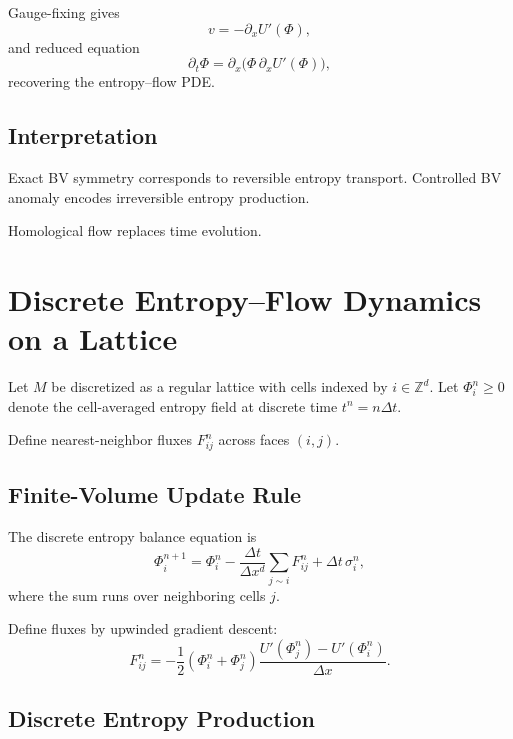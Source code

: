 \documentclass[11pt]{article}
\begin{document}
Gauge-fixing gives
\begin{equation}
v = -\partial_x U'(\Phi),
\end{equation}
and reduced equation
\begin{equation}
\partial_t \Phi
=
\partial_x \big(\Phi\,\partial_x U'(\Phi)\big),
\end{equation}
recovering the entropy–flow PDE.

\subsection*{Interpretation}

Exact BV symmetry corresponds to reversible entropy transport.
Controlled BV anomaly encodes irreversible entropy production.

Homological flow replaces time evolution.

\section{Discrete Entropy--Flow Dynamics on a Lattice}

Let $M$ be discretized as a regular lattice with cells indexed by $i \in \mathbb{Z}^d$.
Let $\Phi_i^n \ge 0$ denote the cell-averaged entropy field at discrete time $t^n = n\Delta t$.

Define nearest-neighbor fluxes $F_{ij}^n$ across faces $(i,j)$.

\subsection*{Finite-Volume Update Rule}

The discrete entropy balance equation is
\begin{equation}
\Phi_i^{n+1}
=
\Phi_i^n
-
\frac{\Delta t}{\Delta x^d}
\sum_{j \sim i}
F_{ij}^n
+
\Delta t\,\sigma_i^n,
\end{equation}
where the sum runs over neighboring cells $j$.

Define fluxes by upwinded gradient descent:
\begin{equation}
F_{ij}^n
=
-\frac{1}{2}
\left(
\Phi_i^n + \Phi_j^n
\right)
\frac{U'(\Phi_j^n)-U'(\Phi_i^n)}{\Delta x}.
\end{equation}

\subsection*{Discrete Entropy Production}
\end{document}
